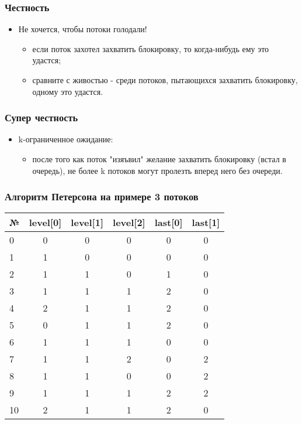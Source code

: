 \begin{frame}
\frametitle{Честность}
\begin{itemize}
    \item<1->Не хочется, чтобы потоки голодали!
    \begin{itemize}
        \item<2->если поток захотел захватить блокировку, то когда-нибудь
             ему это удастся;
        \item<3->сравните с живостью - среди потоков, пытающихся захватить
             блокировку, одному это удастся.
    \end{itemize}
\end{itemize}
\end{frame}

\begin{frame}
\frametitle{Супер честность}
\begin{itemize}
    \item<1->k-ограниченное ожидание:
    \begin{itemize}
        \item<2->после того как поток "изяъвил" желание захватить блокировку
             (встал в очередь), не более k потоков могут пролезть вперед него
             без очереди.
    \end{itemize}
\end{itemize}
\end{frame}

\begin{frame}
\frametitle{Алгоритм Петерсона на примере 3 потоков}
\begin{table}
\begin{tabular}{l | c | c | c | c | c }
№ & level[0] & level[1] & level[2] & last[0] & last[1] \\
\hline\hline

0 & 0 & 0 & 0 & 0 & 0 \\
1 & 1 & 0 & 0 & 0 & 0 \\
2 & 1 & 1 & 0 & 1 & 0 \\
3 & 1 & 1 & 1 & 2 & 0 \\
4 & 2 & 1 & 1 & 2 & 0 \\
5 & 0 & 1 & 1 & 2 & 0 \\
6 & 1 & 1 & 1 & 0 & 0 \\
7 & 1 & 1 & 2 & 0 & 2 \\
8 & 1 & 1 & 0 & 0 & 2 \\
9 & 1 & 1 & 1 & 2 & 2 \\
10 & 2 & 1 & 1 & 2 & 0 \\

\hline
\end{tabular}
\end{table}
\end{frame}
